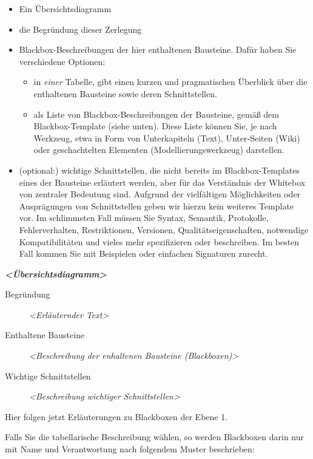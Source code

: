 \documentclass[]{article}
\begin{document}
\begin{itemize}
\item
  Ein Übersichtsdiagramm
\item
  die Begründung dieser Zerlegung
\item
  Blackbox-Beschreibungen der hier enthaltenen Bausteine. Dafür haben
  Sie verschiedene Optionen:

  \begin{itemize}
  \item
    in \emph{einer} Tabelle, gibt einen kurzen und pragmatischen
    Überblick über die enthaltenen Bausteine sowie deren Schnittstellen.
  \item
    als Liste von Blackbox-Beschreibungen der Bausteine, gemäß dem
    Blackbox-Template (siehe unten). Diese Liste können Sie, je nach
    Werkzeug, etwa in Form von Unterkapiteln (Text), Unter-Seiten (Wiki)
    oder geschachtelten Elementen (Modellierungswerkzeug) darstellen.
  \end{itemize}
\item
  (optional:) wichtige Schnittstellen, die nicht bereits im
  Blackbox-Templates eines der Bausteine erläutert werden, aber für das
  Verständnis der Whitebox von zentraler Bedeutung sind. Aufgrund der
  vielfältigen Möglichkeiten oder Ausprägungen von Schnittstellen geben
  wir hierzu kein weiteres Template vor. Im schlimmsten Fall müssen Sie
  Syntax, Semantik, Protokolle, Fehlerverhalten, Restriktionen,
  Versionen, Qualitätseigenschaften, notwendige Kompatibilitäten und
  vieles mehr spezifizieren oder beschreiben. Im besten Fall kommen Sie
  mit Beispielen oder einfachen Signaturen zurecht.
\end{itemize}

\emph{\textbf{\textless{}Übersichtsdiagramm\textgreater{}}}

\begin{description}
\item[Begründung]
\emph{\textless{}Erläuternder Text\textgreater{}}
\item[Enthaltene Bausteine]
\emph{\textless{}Beschreibung der enhaltenen Bausteine
(Blackboxen)\textgreater{}}
\item[Wichtige Schnittstellen]
\emph{\textless{}Beschreibung wichtiger Schnittstellen\textgreater{}}
\end{description}

Hier folgen jetzt Erläuterungen zu Blackboxen der Ebene 1.

Falls Sie die tabellarische Beschreibung wählen, so werden Blackboxen
darin nur mit Name und Verantwortung nach folgendem Muster beschrieben:
\end{document}
